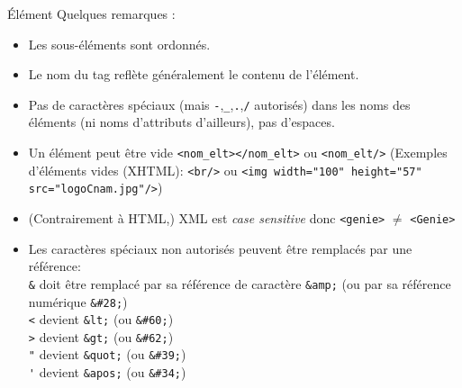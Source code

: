 \begin{frame}{\'El\'ement}
Quelques remarques : 
\begin{itemize}
\item Les sous-\'el\'ements sont ordonnés.  
\item Le nom du tag refl\`ete g\'en\'eralement le contenu de l'\'el\'ement.
\item Pas de caract\`eres sp\'eciaux (mais \verb?-?,\verb?_?,\verb?.?,\verb?/? autoris\'es) dans les noms des \'el\'ements (ni noms d'attributs d'ailleurs), pas d'espaces.
\item Un \'el\'ement peut \^etre vide \verb?<nom_elt></nom_elt>? ou \verb?<nom_elt/>? (Exemples d'éléments vides (XHTML): \verb?<br/>? ou \verb?<img width="100" height="57" src="logoCnam.jpg"/>?) 
\item (Contrairement à HTML,) XML est \textit{case sensitive} donc \verb?<genie>? $\neq$ \verb?<Genie>? 
\item Les caractères spéciaux non autorisés peuvent \^etre remplac\'es par une r\'ef\'erence:\\ 
\verb?&? doit \^etre remplac\'e par sa r\'ef\'erence de caract\`ere \verb?&amp;? (ou par sa r\'ef\'erence num\'erique \verb?&#28;?) \\
\verb?<? devient \verb?&lt;? (ou \verb?&#60;?)\\
\verb?>? devient \verb?&gt;? (ou \verb?&#62;?)\\
\verb?"? devient \verb?&quot;? (ou \verb?&#39;?)\\
\verb?'? devient \verb?&apos;? (ou \verb?&#34;?)\\
\end{itemize}

\end{frame}



